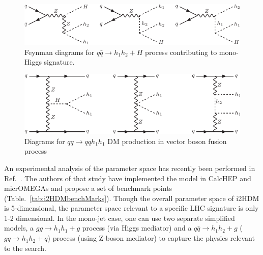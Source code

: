 \begin{figure}[htb]
\includegraphics[width=\textwidth]{figures/EW/i2HDM/fd-mono-h2.pdf} 
\caption{Feynman diagrams for $q\bar{q}\to h_1 h_2+H$  process 
contributing to mono-Higgs signature.}
\label{fig:fd-mono-H2}
\end{figure}
\begin{figure}[htb]
\includegraphics[width=\textwidth]{figures/EW/i2HDM/fd-vbf.pdf} 
\caption{Diagrams for $qq\to qq h_1 h_1$ DM production in vector boson
fusion process}
\label{fig:fd-vbf}
\end{figure}

An experimental analysis of the parameter space has recently been
performed in Ref.~\cite{Belyaev:2015tap}. The authors of that study
have implemented the model in CalcHEP and micrOMEGAs and propose a set
of benchmark points (Table.~\ref{tab:i2HDMbenchMarks}). Though the
overall parameter space of i2HDM is 5-dimensional, the parameter space
relevant to a specific LHC signature is only 1-2 dimensional. In the
mono-jet case, one can use two separate simplified models, a
$gg\to h_1 h_1+g$ process (via Higgs mediator) and a
$q\bar{q}\to h_1 h_2+g$ ($gq\to h_1 h_2+q$) process (using Z-boson
mediator) to capture the physics relevant to the search.

